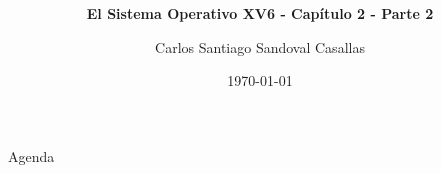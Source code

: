 \documentclass{libs/ufc_format}
\title[Sistemas Operativos]{\huge\textbf{}}
\subtitle{\textbf{El Sistema Operativo XV6 - Capítulo 2 - Parte 2}}
\author{Carlos Santiago Sandoval Casallas}
\institute[UNAL]{
  \normalsize{\email{csandovalc@unal.edu.co}}
  \newline
  \department{Departamento de Ingeniería de Sistemas e Industrial}
  \newline
  \ufc
}
\date{\today}
\begin{document}


\begin{frame}
  \maketitle
\end{frame}

\begin{frame}{Agenda}
  \tableofcontents
\end{frame}
\end{document}
